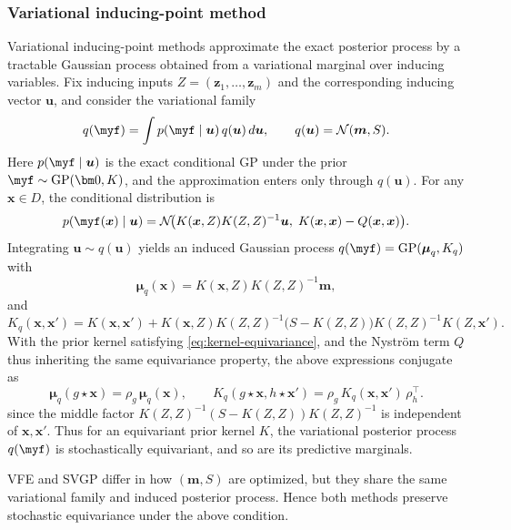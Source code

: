\documentclass[11pt,a4paper]{article}
\newcommand{\bmm}{\boldsymbol{m}}
\newcommand{\bmu}{\boldsymbol{\mu}}
\newcommand{\bx}{\boldsymbol{x}}
\newcommand{\bz}{\boldsymbol{z}}
\begin{document}
\subsubsection{Variational inducing-point method}
\label{subsec:conseq-vfe-svgp}
Variational inducing-point methods approximate the exact posterior process by a tractable Gaussian process obtained from a variational marginal over inducing variables. Fix inducing inputs $Z=\left(\bz_1,\dots,\bz_m\right)$ and the corresponding inducing vector $\boldsymbol{u}$, and consider the
variational family \begin{displaymath}q(\myf)=\int p(\myf\mid \boldsymbol{u})\,q(\boldsymbol{u})\,d\boldsymbol{u},\qquad q(\boldsymbol{u})=\mathcal N(\bmm,S).\end{displaymath}
Here $p(\myf\mid \boldsymbol{u})$ is the exact conditional GP under the prior $\myf\sim\mathrm{GP}(\bm 0,K)$, and the approximation enters
only through $q(\boldsymbol{u})$. For any $\bx\in D$, the conditional distribution is
\begin{displaymath}p\!\left(\myf(\bx)\mid \boldsymbol{u}\right)= \mathcal N\!\big(K(\bx,Z)K(Z,Z)^{-1}\boldsymbol{u},\;K(\bx,\bx)-Q(\bx,\bx)\big).\end{displaymath}
Integrating $\boldsymbol{u}\sim q(\boldsymbol{u})$ yields an induced Gaussian process $q(\myf)=\mathrm{GP}(\bmu_q,K_q)$ with
\begin{displaymath}\bmu_q(\bx)=K(\bx,Z)K(Z,Z)^{-1}\bmm,\end{displaymath}
and
\begin{displaymath}K_q(\bx,\bx')= K(\bx,\bx')+K(\bx,Z)K(Z,Z)^{-1}\big(S-K(Z,Z)\big)K(Z,Z)^{-1}K(Z,\bx').\end{displaymath}
With the prior kernel satisfying  \eqref{eq:kernel-equivariance},
and the Nyström term $Q$ thus inheriting the same equivariance property, the above expressions conjugate as
\begin{displaymath}\bmu_q(g\star \bx)=\rho_g\,\bmu_q(\bx), \qquad K_q(g\star \bx,h\star \bx')=\rho_g\,K_q(\bx,\bx')\,\rho_h^\top.\end{displaymath}
since the middle factor $K(Z,Z)^{-1}(S-K(Z,Z))K(Z,Z)^{-1}$ is independent of $\bx,\bx'.$ Thus for an equivariant prior kernel $K$, the variational posterior process $q(\myf)$ is stochastically equivariant, and so are its predictive marginals.

VFE and SVGP differ in how $(\bmm,S)$ are optimized, %
but they share the same variational family and induced posterior process. Hence both methods preserve stochastic equivariance under the above condition.
\end{document}

